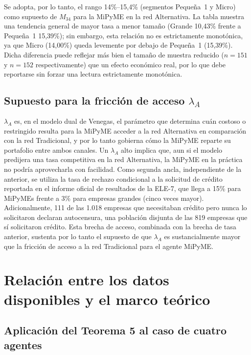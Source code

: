Se adopta, por lo tanto, el rango 14\%--15,4\% (segmentos Pequeña~1 y Micro) como supuesto de $M_{34}$ para la MiPyME en la red Alternativa. La tabla muestra una tendencia general de mayor tasa a menor tamaño (Grande 10,43\% frente a Pequeña~1 15,39\%); sin embargo, esta relación no es estrictamente monotónica, ya que Micro (14,00\%) queda levemente por debajo de Pequeña~1 (15,39\%). Dicha diferencia puede reflejar más bien el tamaño de muestra reducido ($n=151$ y $n=152$ respectivamente) que un efecto económico real, por lo que debe reportarse sin forzar una lectura estrictamente monotónica.

\subsection[Supuesto para la fricción de acceso lambda A]{Supuesto para la fricción de acceso $\lambda_A$}

$\lambda_A$ es, en el modelo dual de Venegas, el parámetro que determina cuán costoso o restringido resulta para la MiPyME acceder a la red Alternativa en comparación con la red Tradicional, y por lo tanto gobierna cómo la MiPyME reparte su portafolio entre ambos canales. Un $\lambda_A$ alto implica que, aun si el modelo predijera una tasa competitiva en la red Alternativa, la MiPyME en la práctica no podría aprovecharla con facilidad. Como segunda ancla, independiente de la anterior, se utiliza la tasa de rechazo condicional a la solicitud de crédito reportada en el informe oficial de resultados de la ELE-7, que llega a 15\% para MiPyMEs frente a 3\% para empresas grandes (cinco veces mayor). Adicionalmente, 111 de las 1.018 empresas que necesitaban crédito pero nunca lo solicitaron declaran autocensura, una población disjunta de las 819 empresas que sí solicitaron crédito. Esta brecha de acceso, combinada con la brecha de tasa anterior, sustenta por lo tanto el supuesto de que $\lambda_A$ es sustancialmente mayor que la fricción de acceso a la red Tradicional para el agente MiPyME.

\section{Relación entre los datos disponibles y el marco teórico}
\label{sec:relacion-teoria-datos}

\subsection{Aplicación del Teorema 5 al caso de cuatro agentes}

